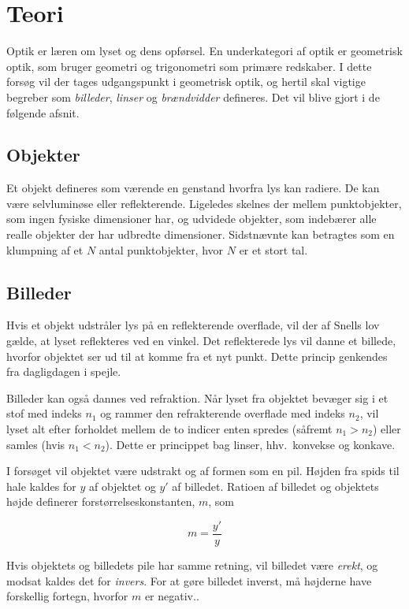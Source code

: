 \section{Teori}
Optik er læren om lyset og dens opførsel. En underkategori af optik er geometrisk optik, som bruger geometri og trigonometri som primære redskaber. I dette forsøg vil der tages udgangspunkt i geometrisk optik, og hertil skal vigtige begreber som \emph{billeder}, \emph{linser} og \emph{brændvidder} defineres. Det vil blive gjort i de følgende afsnit.

\subsection{Objekter} 
Et objekt defineres som værende en genstand hvorfra lys kan radiere. De kan være selvluminøse eller reflekterende. Ligeledes skelnes der mellem punktobjekter, som ingen fysiske dimensioner har, og udvidede objekter, som indebærer alle realle objekter der har udbredte dimensioner. Sidstnævnte kan betragtes som en klumpning af et $N$ antal punktobjekter, hvor $N$ er et stort tal.

\subsection{Billeder}
Hvis et objekt udstråler lys på en reflekterende overflade, vil der af Snells lov gælde, at lyset reflekteres ved en vinkel. Det reflekterede lys vil danne et billede, hvorfor objektet ser ud til at komme fra et nyt punkt. Dette princip genkendes fra dagligdagen i spejle.

Billeder kan også dannes ved refraktion. Når lyset fra objektet bevæger sig i et stof med indeks $n_1$ og rammer den refrakterende overflade med indeks $n_2$, vil lyset alt efter forholdet mellem de to indicer enten spredes (såfremt $n_1 > n_2$) eller samles (hvis $n_1 < n_2$). Dette er princippet bag linser, hhv.\ konvekse og konkave.


I forsøget vil objektet være udstrakt og af formen som en pil. Højden fra spids til hale kaldes for $y$ af objektet og $y'$ af billedet. Ratioen af billedet og objektets højde definerer forstørrelseskonstanten, $m$, som

\begin{equation}
    m = \frac{y'}{y}
    \label{eq:m}
\end{equation}

Hvis objektets og billedets pile har samme retning, vil billedet være \emph{erekt}, og modsat kaldes det for \emph{invers}. For at gøre billedet inverst, må højderne have forskellig fortegn, hvorfor $m$ er negativ..

